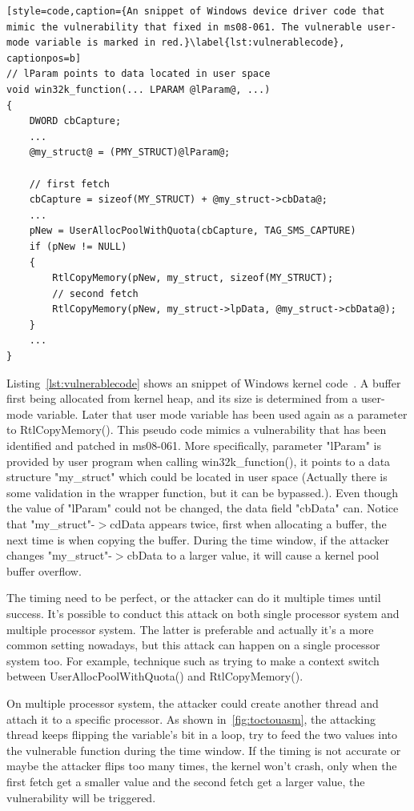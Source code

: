 \begin{lstlisting}[style=code,caption={An snippet of Windows device driver code that mimic the vulnerability that fixed in ms08-061. The vulnerable user-mode variable is marked in red.}\label{lst:vulnerablecode}, captionpos=b]
// lParam points to data located in user space
void win32k_function(... LPARAM @lParam@, ...) 
{
    DWORD cbCapture;
    ...
    @my_struct@ = (PMY_STRUCT)@lParam@;

    // first fetch
    cbCapture = sizeof(MY_STRUCT) + @my_struct->cbData@;  
    ...
    pNew = UserAllocPoolWithQuota(cbCapture, TAG_SMS_CAPTURE)
    if (pNew != NULL) 
    {
        RtlCopyMemory(pNew, my_struct, sizeof(MY_STRUCT);
        // second fetch
        RtlCopyMemory(pNew, my_struct->lpData, @my_struct->cbData@);   
    }
    ...
}

\end{lstlisting}

Listing~\ref{lst:vulnerablecode} shows an snippet of Windows kernel code~\cite{jurczyk2013identifying}. A buffer first being allocated from kernel heap, and its size is determined from a user-mode variable. Later that user mode variable has been used again as a parameter to RtlCopyMemory(). This pseudo code mimics a vulnerability that has been identified and patched in ms08-061. More specifically, parameter "lParam" is provided by user program when calling win32k\_function(), it points to a data structure "my\_struct" which could be located in user space (Actually there is some validation in the wrapper function, but it can be bypassed.). Even though the value of "lParam" could not be changed, the data field "cbData" can. Notice that "my\_struct"-$>$cdData appears twice, first when allocating a buffer, the next time is when copying the buffer. During the time window, if the attacker changes "my\_struct"-$>$cbData to a larger value, it will cause a kernel pool buffer overflow. 

The timing need to be perfect, or the attacker can do it multiple times until success. It's possible to conduct this attack on both single processor system and multiple processor system. The latter is preferable and actually it's a more common setting nowadays, but this attack can happen on a single processor system too. For example, technique such as trying to make a context switch between UserAllocPoolWithQuota() and RtlCopyMemory().

On multiple processor system, the attacker could create another thread and attach it to a specific processor. As shown in~\autoref{fig:toctouasm}, the attacking thread keeps flipping the variable's bit in a loop, try to feed the two values into the vulnerable function during the time window.
If the timing is not accurate or maybe the attacker flips too many times, the kernel won't crash, only when the first fetch get a smaller value and the second fetch get a larger value, the vulnerability will be triggered.

